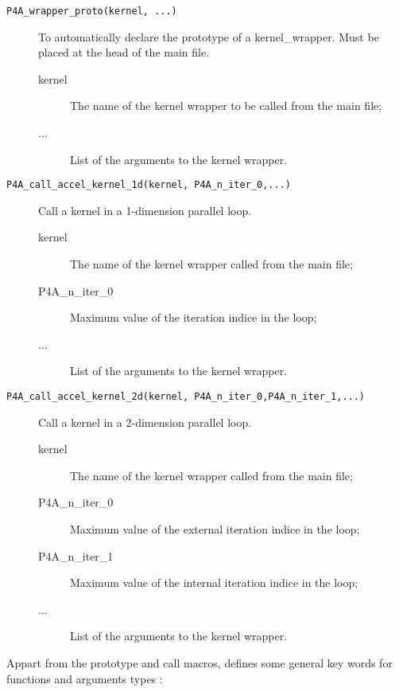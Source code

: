 \documentclass[a4paper]{article}
\begin{document}
\begin{description}
\item[\texttt{P4A\_wrapper\_proto(kernel, ...)}] To automatically
  declare the prototype of a kernel\_wrapper. Must be placed at the
  head of the main file.

  \begin{description}
  \item[kernel] The name of the kernel wrapper to be called from the main file;
  \item[...] List of the arguments to the kernel wrapper.
  \end{description}

\item[\texttt{P4A\_call\_accel\_kernel\_1d(kernel,
    P4A\_n\_iter\_0,...)}] Call a kernel in a 1-dimension parallel
  loop.

  \begin{description}
  \item[kernel] The name of the kernel wrapper called from the main file;
  \item[P4A\_n\_iter\_0] Maximum  value of the iteration indice in the loop;
  \item[...] List of the arguments to the kernel wrapper.
  \end{description}

\item[\texttt{P4A\_call\_accel\_kernel\_2d(kernel,
    P4A\_n\_iter\_0,P4A\_n\_iter\_1,...)}] Call a kernel in a
  2-dimension parallel loop.

  \begin{description}
  \item[kernel] The name of the kernel wrapper called from the main file;
  \item[P4A\_n\_iter\_0] Maximum value of the external iteration
    indice in the loop;
  \item[P4A\_n\_iter\_1] Maximum value of the internal iteration
    indice in the loop;
  \item[...] List of the arguments to the kernel wrapper.
  \end{description}

\end{description}

Appart from the prototype and call macros, \Apfa defines some general
key words for functions and arguments types :
\end{document}
